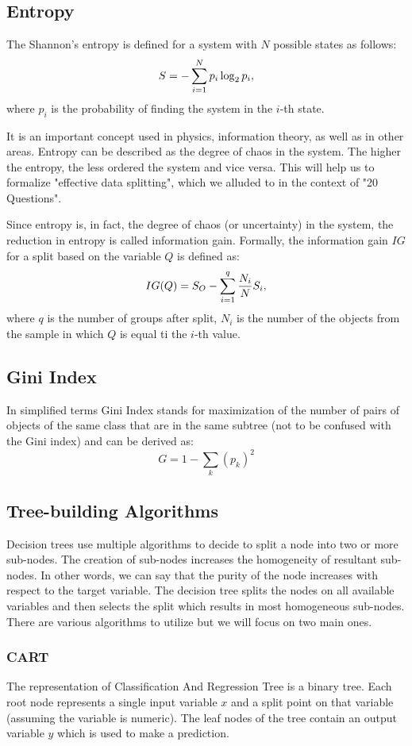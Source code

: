 \documentclass{article}
\begin{document}
\subsection{Entropy}
The Shannon's entropy \cite{Lotfi2010} is defined for a system with $N$ possible states as follows:
\[ \Large S = -\sum_{i=1}^{N}p_i \log_2{p_i}, \]
where $p_i$ is the probability of finding the system in the $i$-th state. 

It is an important concept used in physics, information theory, as well as in other areas. Entropy can be described as the degree of chaos in the system. The higher the entropy, the less ordered the system and vice versa. This will help us to formalize "effective data splitting", which we alluded to in the context of "20 Questions".

Since entropy is, in fact, the degree of chaos (or uncertainty) in the system, the reduction in entropy is called information gain. Formally, the information gain $IG$ for a split based on the variable $Q$ is defined as: 
\[ \Large IG(Q) = S_O - \sum_{i=1}^{q}\frac{N_i}{N}S_i, \]
where $q$ is the number of groups after split, $N_i$ is the number of the objects from the sample in which $Q$ is equal ti the $i$-th value. 

\subsection{Gini Index}
In simplified terms Gini Index stands for maximization of the number of pairs of objects of the same class that are in the same subtree (not to be confused with the Gini index) and can be derived as: 
\[ G = 1 - \sum\limits_k (p_k)^2 \]

\subsection{Tree-building Algorithms}
Decision trees use multiple algorithms to decide to split a node into two or more sub-nodes. The creation of sub-nodes increases the homogeneity of resultant sub-nodes. In other words, we can say that the purity of the node increases with respect to the target variable. The decision tree splits the nodes on all available variables and then selects the split which results in most homogeneous sub-nodes. There are various algorithms to utilize but we will focus on two main ones.  
\subsubsection{CART}
The representation of Classification And Regression Tree is a binary tree. Each root node represents a single input variable $x$ and a split point on that variable (assuming the variable is numeric). The leaf nodes of the tree contain an output variable $y$ which is used to make a prediction.
\end{document}
